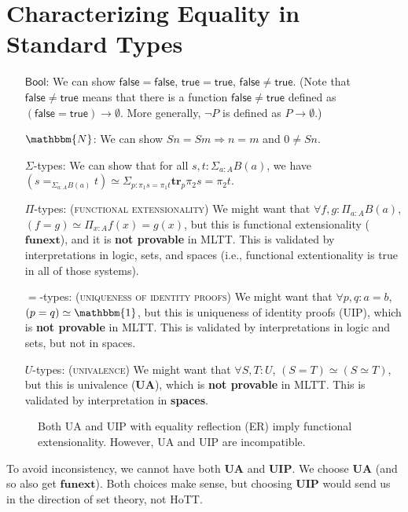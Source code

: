 \documentclass{amsart}
\theoremstyle{definition}
\newcommand{\N}{\mathbbm{N}}
\newcommand{\Bool}{\ensuremath{\mathsf{Bool}}}
\newcommand{\True}{\ensuremath{\mathsf{true}}}
\newcommand{\False}{\ensuremath{\mathsf{false}}}
\begin{document}
\section{Characterizing Equality in Standard Types}

\begin{itemize}
\item[\Bool:] We can show $\False = \False$,
$\True = \True$,
$\False \neq \True$. (Note that $\False \neq \True$ means that there is a function $\False \neq \True$ defined as $(\False = \True)\to \emptyset$. More generally, $\neg P$ is defined as $P\to\emptyset$.)
\item[$\N$:] We can show $S n = S m \Rightarrow n = m$ and $0 \neq S n$.
\item[$\Sigma$-types:] We can show that for all $s, t : \Sigma_{a : A} B(a)$, we have $(s \mathbf{=}_{\Sigma_{a : A} B(a)} t) \simeq \Sigma_{p : \pi_1 s = \pi_1 t} \mathbf{tr}_p \pi_2 s = \pi_2 t$.
\item[$\Pi$-types:] \textsc{(functional extensionality)} We might want that $\forall f, g : \Pi_{a : A} B(a)$, $(f = g) \simeq \Pi_{x : A} f(x) = g(x)$, but this is functional extensionality ($\mathbf{funext}$), and it is \textbf{not provable} in MLTT. This is validated by interpretations  in logic, sets, and spaces (i.e., functional extentionality is true in all of those systems).
\item[$=$-types:] \textsc{(uniqueness of identity proofs)} We might want that $\forall p, q : a = b$, $(p = q) \simeq \mathbbm{1}$, but this is uniqueness of identity proofs (UIP), which is \textbf{not provable} in MLTT. This is validated by interpretations in logic and sets, but not in spaces. 
\item[$U$-types:] \textsc{(univalence)} We might want that $\forall S, T : U$, $(S = T) \simeq (S \simeq T)$, but this is univalence ($\mathbf{UA}$), which is \textbf{not provable} in MLTT. This is validated by interpretation in \textbf{spaces}.
\end{itemize}

\begin{figure}[h]
    \centering
    
    \caption{Both UA and UIP with equality reflection (ER) imply functional extensionality.
    However, UA and UIP are incompatible.}
    \label{fig:ua-uip-funext}
\end{figure}

To avoid inconsistency, we cannot have both $\mathbf{UA}$ and $\mathbf{UIP}$. We choose $\mathbf{UA}$ (and so also get $\mathbf{funext}$). 
Both choices make sense, but choosing $\mathbf{UIP}$ would send us in the direction of set theory, not HoTT.
\end{document}
